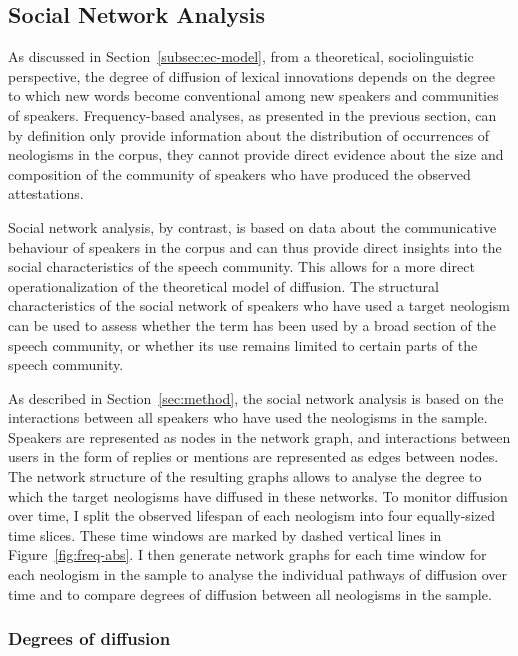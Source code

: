\documentclass[
  a4paper,
  abstract=on,
  captions=tableabove
  ]{scrartcl}
\begin{document}
  \subsection{Social Network Analysis}
    \label{subsec:sna}

    As discussed in Section~\ref{subsec:ec-model}, from a theoretical, sociolinguistic perspective, the degree of diffusion of lexical innovations depends on the degree to which new words become conventional among new speakers and communities of speakers. Frequency-based analyses, as presented in the previous section, can by definition only provide information about the distribution of occurrences of neologisms in the corpus, they cannot provide direct evidence about the size and composition of the community of speakers who have produced the observed attestations.

    Social network analysis, by contrast, is based on data about the communicative behaviour of speakers in the corpus and can thus provide direct insights into the social characteristics of the speech community. This allows for a more direct operationalization of the theoretical model of diffusion. The structural characteristics of the social network of speakers who have used a target neologism can be used to assess whether the term has been used by a broad section of the speech community, or whether its use remains limited to certain parts of the speech community.

    As described in Section~\ref{sec:method}, the social network analysis is based on the interactions between all speakers who have used the neologisms in the sample. Speakers are represented as nodes in the network graph, and interactions between users in the form of replies or mentions are represented as edges between nodes. The network structure of the resulting graphs allows to analyse the degree to which the target neologisms have diffused in these networks. To monitor diffusion over time, I split the observed lifespan of each neologism into four equally-sized time slices. These time windows are marked by dashed vertical lines in Figure~\ref{fig:freq-abs}. I then generate network graphs for each time window for each neologism in the sample to analyse the individual pathways of diffusion over time and to compare degrees of diffusion between all neologisms in the sample.

    \subsubsection{Degrees of diffusion}
\end{document}
